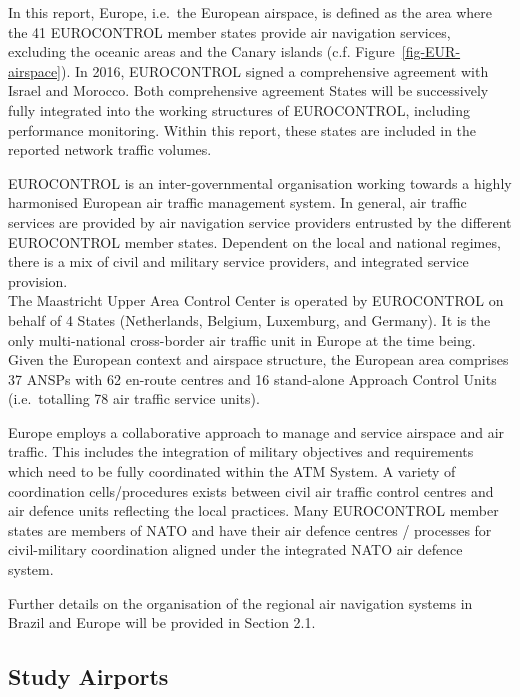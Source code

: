 \documentclass[
  a4paper,
  DIV=11,
  numbers=noendperiod]{scrreport}
\begin{document}
In this report, Europe, i.e.~the European airspace, is defined as the
area where the 41 EUROCONTROL member states provide air navigation
services, excluding the oceanic areas and the Canary islands (c.f.
Figure~\ref{fig-EUR-airspace}). In 2016, EUROCONTROL signed a
comprehensive agreement with Israel and Morocco. Both comprehensive
agreement States will be successively fully integrated into the working
structures of EUROCONTROL, including performance monitoring. Within this
report, these states are included in the reported network traffic
volumes.

EUROCONTROL is an inter-governmental organisation working towards a
highly harmonised European air traffic management system. In general,
air traffic services are provided by air navigation service providers
entrusted by the different EUROCONTROL member states. Dependent on the
local and national regimes, there is a mix of civil and military service
providers, and integrated service provision.\\
The Maastricht Upper Area Control Center is operated by EUROCONTROL on
behalf of 4 States (Netherlands, Belgium, Luxemburg, and Germany). It is
the only multi-national cross-border air traffic unit in Europe at the
time being. Given the European context and airspace structure, the
European area comprises 37 ANSPs with 62 en-route centres and 16
stand-alone Approach Control Units (i.e.~totalling 78 air traffic
service units).

Europe employs a collaborative approach to manage and service airspace
and air traffic. This includes the integration of military objectives
and requirements which need to be fully coordinated within the ATM
System. A variety of coordination cells/procedures exists between civil
air traffic control centres and air defence units reflecting the local
practices. Many EUROCONTROL member states are members of NATO and have
their air defence centres / processes for civil-military coordination
aligned under the integrated NATO air defence system.

Further details on the organisation of the regional air navigation
systems in Brazil and Europe will be provided in Section 2.1.

\hypertarget{study-airports}{%
\subsection{Study Airports}\label{study-airports}}
\end{document}
